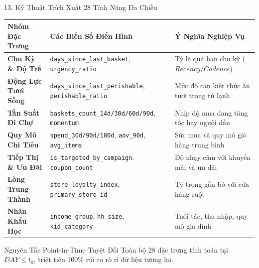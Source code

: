 \documentclass[aspectratio=169, 10pt]{beamer}
\begin{document}
\begin{frame}{13. Kỹ Thuật Trích Xuất 28 Tính Năng Đa Chiều}
  \centering
  \footnotesize
  \renewcommand{\arraystretch}{1.02}
  \begin{tabularx}{\textwidth}{lYl}
    \toprule
    \textbf{Nhóm Đặc Trưng} & \textbf{Các Biến Số Điển Hình} & \textbf{Ý Nghĩa Nghiệp Vụ} \\
    \midrule
    \textbf{Chu Kỳ \& Độ Trễ} & \texttt{days\_since\_last\_basket}, \texttt{urgency\_ratio} & Tỷ lệ quá hạn chu kỳ ($Recency / Cadence$) \\
    \textbf{Động Lực Tươi Sống} & \texttt{days\_since\_last\_perishable}, \texttt{perishable\_ratio} & Mức độ cạn kiệt thức ăn tươi trong tủ lạnh \\
    \textbf{Tần Suất Đi Chợ} & \texttt{baskets\_count\_14d/30d/60d/90d}, \texttt{momentum} & Nhịp độ mua đang tăng tốc hay nguội dần \\
    \textbf{Quy Mô Chi Tiêu} & \texttt{spend\_30d/90d/180d}, \texttt{aov\_90d}, \texttt{avg\_items} & Sức mua và quy mô giỏ hàng trung bình \\
    \textbf{Tiếp Thị \& Ưu Đãi} & \texttt{is\_targeted\_by\_campaign}, \texttt{coupon\_count} & Độ nhạy cảm với khuyến mãi và ưu đãi \\
    \textbf{Lòng Trung Thành} & \texttt{store\_loyalty\_index}, \texttt{primary\_store\_id} & Tỷ trọng gắn bó với cửa hàng ruột \\
    \textbf{Nhân Khẩu Học} & \texttt{income\_group}, \texttt{hh\_size}, \texttt{kid\_category} & Tuổi tác, thu nhập, quy mô gia đình \\
    \bottomrule
  \end{tabularx}
  \vspace{0.2cm}
  \begin{alertblock}{Nguyên Tắc Point-in-Time Tuyệt Đối}
    \centering \small
    Toàn bộ 28 đặc trưng tính toán tại $DAY \le t_0$, triệt tiêu 100\% rủi ro rò rỉ dữ liệu tương lai.
  \end{alertblock}
\end{frame}
\end{document}

